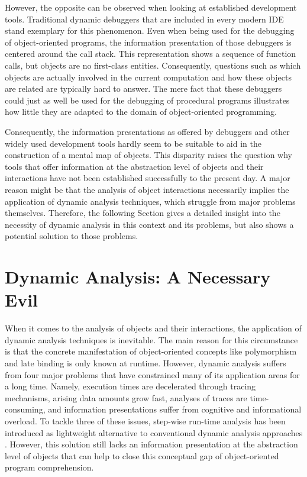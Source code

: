 However, the opposite can be observed when looking at established development tools.
Traditional dynamic debuggers that are included in every modern IDE stand exemplary for this phenomenon.
Even when being used for the debugging of object-oriented programs, the information presentation of those debuggers is centered around the call stack.
This representation shows a sequence of function calls, but objects are no first-class entities.
Consequently, questions such as which objects are actually involved in the current computation and how these objects are related are typically hard to answer.
The mere fact that these debuggers could just as well be used for the debugging of procedural programs illustrates how little they are adapted to the domain of object-oriented programming.

Consequently, the information presentations as offered by debuggers and other widely used development tools hardly seem to be suitable to aid in the construction of a mental map of objects.
This disparity raises the question why tools that offer information at the abstraction level of objects and their interactions have not been established successfully to the present day.
A major reason might be that the analysis of object interactions necessarily implies the application of dynamic analysis techniques, which struggle from major problems themselves.
Therefore, the following Section gives a detailed insight into the necessity of dynamic analysis in this context and its problems, but also shows a potential solution to those problems.

\section[Dynamic Analysis: A Necessary Evil]{Dynamic Analysis: A Necessary Evil%
}
\label{s:BackgroundAnalysis}
When it comes to the analysis of objects and their interactions, the application of dynamic analysis techniques is inevitable.
The main reason for this circumstance is that the concrete manifestation of object-oriented concepts like polymorphism and late binding is only known at runtime.
However, dynamic analysis suffers from four major problems that have constrained many of its application areas for a long time.
Namely, execution times are decelerated through tracing mechanisms, arising data amounts grow fast, analyses of traces are time-consuming, and information presentations suffer from cognitive and informational overload.
To tackle three of these issues, step-wise run-time analysis has been introduced as lightweight alternative to conventional dynamic analysis approaches \cite{perscheid_immediacy_2010}.
However, this solution still lacks an information presentation at the abstraction level of objects that can help to close this conceptual gap of object-oriented program comprehension.


